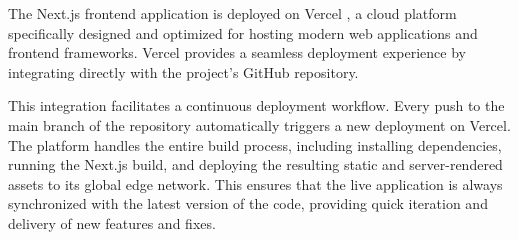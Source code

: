The Next.js frontend application is deployed on Vercel \cite{NEXTJS}, a cloud platform specifically designed and optimized for hosting modern web applications and frontend frameworks. Vercel provides a seamless deployment experience by integrating directly with the project's GitHub repository.

This integration facilitates a continuous deployment workflow. Every push to the main branch of the repository automatically triggers a new deployment on Vercel. The platform handles the entire build process, including installing dependencies, running the Next.js build, and deploying the resulting static and server-rendered assets to its global edge network. This ensures that the live application is always synchronized with the latest version of the code, providing quick iteration and delivery of new features and fixes.